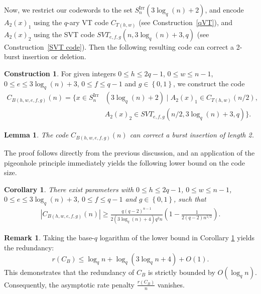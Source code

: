 \documentclass[pdflatex,sn-mathphys-num]{sn-jnl}
\theoremstyle{theorem}%
\newtheorem{lemma}{Lemma}
\newtheorem{corollary}[theorem]{Corollary}
\theoremstyle{definition}
\newtheorem{remark}[theorem]{Remark}
\theoremstyle{construction}
\newtheorem{construction}{Construction}
\newtheorem{open problem}{Open problem}
\begin{document}
Now, we restrict our codewords to the set $S^{\mathrm{Irr}}_{n}(3\log_{q}(n)+2)$, and encode $A_{2}(x)_{1}$ using the $q$-ary VT code $C_{T(h,w)}$ (see Construction~\ref{qVT}), and $A_{2}(x)_{2}$ using the SVT code $SVT_{e,f,g}(n,3\log_{q}(n)+3,q)$ (see Construction~\ref{SVT code}). Then the following resulting code can correct a 2-burst insertion or deletion.


\begin{construction}\label{Irr burst}
For given integers $0\le h \le 2q-1$, $0\le w \le n-1$, $0\le e\le 3\log_{q}(n)+3$, $0\le f\le q-1$ and $g\in \left\{0,1\right\}$, we construct the code
\begin{equation}
	\begin{split}
		C_{B(h,w,e,f,g)}(n) = \bigg\{  x \in S^{\mathrm{Irr}}_{n}&(3\log_{q}(n)+2) \mid A_{2}(x)_{1} \in C_{T(h,w)}(n/2), \\
		& A_{2}(x)_{2} \in SVT_{e,f,g}(n/2,3\log_{q}(n)+3,q) \bigg\}.
	\end{split}
\end{equation}

\end{construction}
\begin{lemma}
The code $C_{B\left(h,w,e,f,g\right)}(n)$ can correct a burst insertion of length 2.
\end{lemma}
The proof follows directly from the previous discussion, and an application of the pigeonhole principle immediately yields the following lower bound on the code size.
\begin{corollary}\label{C_{B}}
There exist parameters with $0\le h \le 2q-1$, $0\le w \le n-1$, $0\le e\le 3\log_{q}(n)+3$, $0\le f\le q-1$ and $g\in \left\{0,1\right\}$, such that 
\begin{align}
	\left |C_{B\left(h,w,e,f,g\right)}(n) \right | \ge \frac{q(q-2)^{n-1}}{2\left(3\log_{q}(n)+4\right)q^{2}n}\left(1-\frac{1}{2(q-2)n^{1/2}}\right).
\end{align}
\end{corollary} 

\begin{remark}
 Taking the base-$q$ logarithm of the lower bound in Corollary \ref{C_{B}} yields the redundancy:
	$$r(C_B) \le \log_q n + \log_q(3\log_q n + 4) + O(1).$$
	This demonstrates that the redundancy of $C_B$ is strictly bounded by $O(\log_q n)$. Consequently, the asymptotic rate penalty $\frac{r(C_B)}{n}$ vanishes.
\end{remark}
\end{document}
